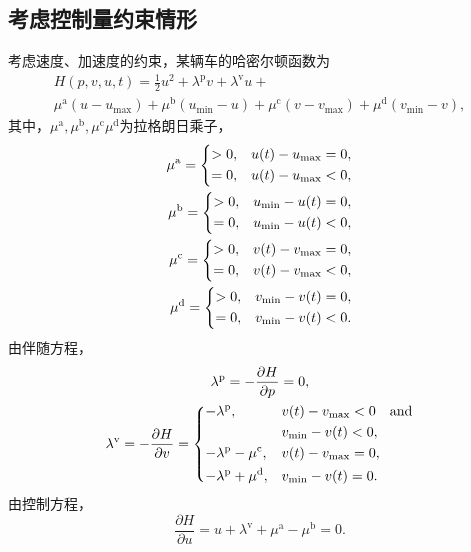 \subsection{考虑控制量约束情形}
\label{ssec:c}
考虑速度、加速度的约束，某辆车的哈密尔顿函数为
\begin{multline}
H(p,v,u,t)=\frac12u^2+\lambda^\mathrm{p}v + \lambda^\mathrm{v}u+\\
\mu^\mathrm{a}(u-u_{\max})+\mu^\mathrm{b}(u_{\min}-u)+\mu^\mathrm{c}(v-v_{\max})+\mu^\mathrm{d}(v_{\min}-v),
\end{multline}
其中，$\mu^\mathrm{a},\mu^\mathrm{b},\mu^\mathrm{c}\mu^\mathrm{d}$为拉格朗日乘子，
\begin{align}
\mu^\mathrm{a}=\begin{dcases}
>0, & u(t)-u_{\max}=0,\\
=0, & u(t)-u_{\max}<0,
\end{dcases}\\
\mu^\mathrm{b}=\begin{dcases}
>0, & u_{\min}-u(t)=0,\\
=0, & u_{\min}-u(t)<0,
\end{dcases}\\
\mu^\mathrm{c}=\begin{dcases}
>0, & v(t)-v_{\max}=0,\\
=0, & v(t)-v_{\max}<0,
\end{dcases}\\
\mu^\mathrm{d}=\begin{dcases}
>0, & v_{\min}-v(t)=0,\\
=0, & v_{\min}-v(t)<0.
\end{dcases}
\end{align}
由伴随方程，
\begin{gather}
\lambda^\mathrm{p}=-\frac{\partial H}{\partial p} = 0,\\
\lambda^\mathrm{v}=-\frac{\partial H}{\partial v} =
\begin{dcases}
-\lambda^\mathrm{p}, & v(t)-v_{\max}<0 \quad \text{and}\\ & v_{\min}-v(t)<0,\\
-\lambda^\mathrm{p}-\mu^\mathrm{c}, & v(t)-v_{\max}=0,\\
-\lambda^\mathrm{p}+\mu^\mathrm{d}, & v_{\min}-v(t)=0.
\end{dcases}
\end{gather}
由控制方程，
\begin{equation}
\frac{\partial H}{\partial u}=u+\lambda^\mathrm{v}+\mu^\mathrm{a}-\mu^\mathrm{b}=0.
\end{equation}
